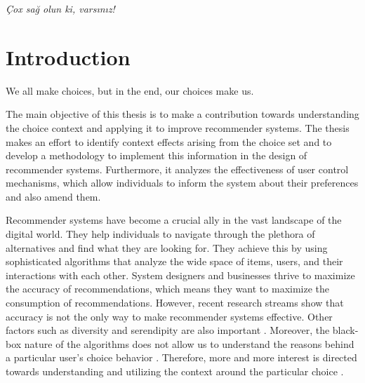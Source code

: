 \documentclass[a4paper,12pt]{article}
\begin{document}
\textit{Çox sağ olun ki, varsınız!}



\clearpage
\tableofcontents
\newpage
\listoffigures
\clearpage
\listoftables
\newpage


\newpage
\section{Introduction}

\epigraph{We all make choices, but in the end, our choices make us.}{}


The main objective of this thesis is to make a contribution towards understanding the choice context and applying it to improve recommender systems. The thesis makes an effort to identify context effects arising from the choice set and to develop a methodology to implement this information in the design of recommender systems. Furthermore, it analyzes the effectiveness of user control mechanisms, which allow individuals to inform the system about their preferences and also amend them.

Recommender systems have become a crucial ally in the vast landscape of the digital world. They help individuals to navigate through the plethora of alternatives and find what they are looking for. They achieve this by using sophisticated algorithms that analyze the wide space of items, users, and their interactions with each other. System designers and businesses thrive to maximize the accuracy of recommendations, which means they want to maximize the consumption of recommendations. However, recent research streams show that accuracy is not the only way to make recommender systems effective. Other factors such as diversity and serendipity are also important \citep{kaminskas2016diversity}. Moreover, the black-box nature of the algorithms does not allow us to understand the reasons behind a particular user's choice behavior \citep{kotkovSurveySerendipityRecommender2016, samih2021exmrec2vec}. Therefore, more and more interest is directed towards understanding and utilizing the context around the particular choice \citep{adomavicius2005toward}.
\end{document}
